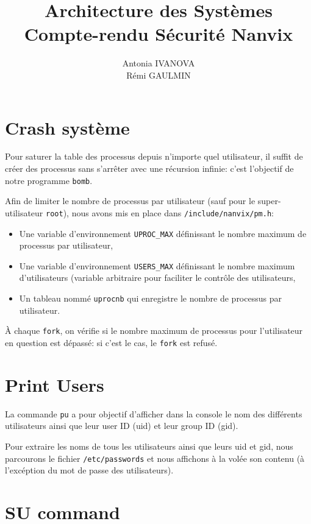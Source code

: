 \documentclass[a4paper,11pt,french]{article}
\title{Architecture des Systèmes\\Compte-rendu Sécurité Nanvix}
\author{Antonia IVANOVA\\Rémi GAULMIN}
\begin{document}
\maketitle

\section{Crash système}

Pour saturer la table des processus depuis n'importe quel utilisateur, il suffit de créer des processus sans s'arrêter avec une récursion infinie: c'est l'objectif de notre programme \texttt{bomb}.

Afin de limiter le nombre de processus par utilisateur (sauf pour le super-utilisateur \texttt{root}), nous avons mis en place dans \texttt{/include/nanvix/pm.h}:

\begin{itemize}
  \item Une variable d'environnement \texttt{UPROC\_MAX} définissant le nombre maximum de processus par utilisateur,
  \item Une variable d'environnement \texttt{USERS\_MAX} définissant le nombre maximum d'utilisateurs (variable arbitraire pour faciliter le contrôle des utilisateurs,
  \item Un tableau nommé \texttt{uprocnb} qui enregistre le nombre de processus par utilisateur.
\end{itemize}

À chaque \texttt{fork}, on vérifie si le nombre maximum de processus pour l'utilisateur en question est dépassé: si c'est le cas, le \texttt{fork} est refusé.

\section{Print Users}

La commande \texttt{pu} a pour objectif d'afficher dans la console le nom des différents utilisateurs ainsi que leur user ID (uid) et leur group ID (gid).

Pour extraire les noms de tous les utilisateurs ainsi que leurs uid et gid, nous parcourons le fichier \texttt{/etc/passwords} et nous affichons à la volée son contenu (à l'excéption du mot de passe des utilisateurs).

\section{SU command}
\end{document}
